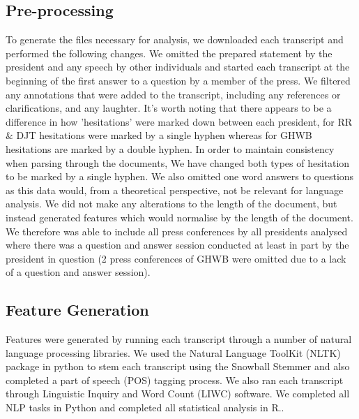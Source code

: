 \documentclass[10pt, letterpaper, twoside, openany]{thesis}
\begin{document}
\subsection{Pre-processing}
To generate the files necessary for analysis, we downloaded each transcript and performed the following changes. We omitted the prepared statement by the president and any speech by other individuals and started each transcript at the beginning of the first answer to a question by a member of the press. We filtered any annotations that were added to the transcript, including any references or clarifications, and any laughter. It's worth noting that there appears to be a difference in how 'hesitations' were marked down between each president, for RR \& DJT hesitations were marked by a single hyphen whereas for GHWB hesitations are marked by a double hyphen. In order to maintain consistency when parsing through the documents, We have changed both types of hesitation to be marked by a single hyphen. We also omitted one word answers to questions as this data would, from a theoretical perspective, not be relevant for language analysis. We did not make any alterations to the length of the document, but instead generated features which would normalise by the length of the document. We therefore was able to include all press conferences by all presidents analysed where there was a question and answer session conducted at least in part by the president in question (2 press conferences of GHWB were omitted due to a lack of a question and answer session).

\subsection{Feature Generation}
Features were generated by running each transcript through a number of natural language processing libraries. We used the Natural Language ToolKit (NLTK) package \cite{Bird2009} in python to stem each transcript using the Snowball Stemmer and also completed a part of speech (POS) tagging process. We also ran each transcript through Linguistic Inquiry and Word Count (LIWC) \cite{Pennebaker2015} software. We completed all NLP tasks in Python and completed all statistical analysis in R.. 
\par 
\end{document}
